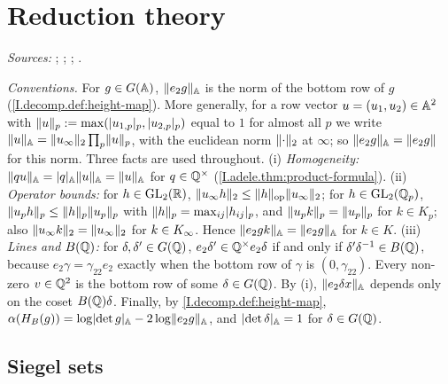 
\chapter{Reduction theory}\label{ch:ch-0-08-reduction}

\noindent\emph{Sources:} \cite{Bor-fin}; \cite[§§2, 6]{AIntro}; \cite[§1]{A-R1}; \cite[Lecture II]{Gel}.

\noindent\emph{Conventions.} For $g\in G(\mathbb{A})$, $\lVert e_2g\rVert_{\mathbb{A}}$ is the norm of the bottom row of $g$
(\cref{I.decomp.def:height-map}). More generally, for a row vector $u=(u_1,u_2)\in\mathbb{A}^2$ with $\lVert u\rVert_p:=\max(\lvert u_{1,p}\rvert_p,
\lvert u_{2,p}\rvert_p)$ equal to $1$ for almost all $p$ we write $\lVert u\rVert_{\mathbb{A}}=\lVert u_\infty\rVert_2\prod_p\lVert u\rVert_p$, with the euclidean norm
$\lVert\cdot\rVert_2$ at $\infty$; so $\lVert e_2g\rVert_{\mathbb{A}}=\lVert e_2g\rVert$ for this norm. Three facts are used throughout.
(i) \emph{Homogeneity:} $\lVert qu\rVert_{\mathbb{A}}=\lvert q\rvert_{\mathbb{A}}\lVert u\rVert_{\mathbb{A}}=\lVert u\rVert_{\mathbb{A}}$ for $q\in\mathbb{Q}^\times$ (\cref{I.adele.thm:product-formula}).
(ii) \emph{Operator bounds:} for $h\in\mathrm{GL}_2(\mathbb{R})$, $\lVert u_\infty h\rVert_2\le\lVert h\rVert_{\mathrm{op}}\lVert u_\infty\rVert_2$; for $h\in\mathrm{GL}_2(\mathbb{Q}_p)$,
$\lVert u_ph\rVert_p\le\lVert h\rVert_p\lVert u_p\rVert_p$ with $\lVert h\rVert_p=\max_{ij}\lvert h_{ij}\rvert_p$, and $\lVert u_pk\rVert_p=\lVert u_p\rVert_p$ for $k\in K_p$; also
$\lVert u_\infty k\rVert_2=\lVert u_\infty\rVert_2$ for $k\in K_\infty$. Hence $\lVert e_2gk\rVert_{\mathbb{A}}=\lVert e_2g\rVert_{\mathbb{A}}$ for $k\in K$.
(iii) \emph{Lines and $B(\mathbb{Q})$:} for $\delta,\delta'\in G(\mathbb{Q})$, $e_2\delta'\in\mathbb{Q}^\times e_2\delta$ if and only if $\delta'\delta^{-1}\in B(\mathbb{Q})$, because
$e_2\gamma=\gamma_{22}e_2$ exactly when the bottom row of $\gamma$ is $(0,\gamma_{22})$. Every non-zero $v\in\mathbb{Q}^2$ is the bottom row of
some $\delta\in G(\mathbb{Q})$. By (i), $\lVert e_2\delta x\rVert_{\mathbb{A}}$ depends only on the coset $B(\mathbb{Q})\delta$.
Finally, by \cref{I.decomp.def:height-map}, $\alpha(H_B(g))=\log\lvert\det g\rvert_{\mathbb{A}}-2\log\lVert e_2g\rVert_{\mathbb{A}}$, and $\lvert\det\delta\rvert_{\mathbb{A}}=1$ for
$\delta\in G(\mathbb{Q})$.

\section{Siegel sets}\label{sec:red-siegel}

